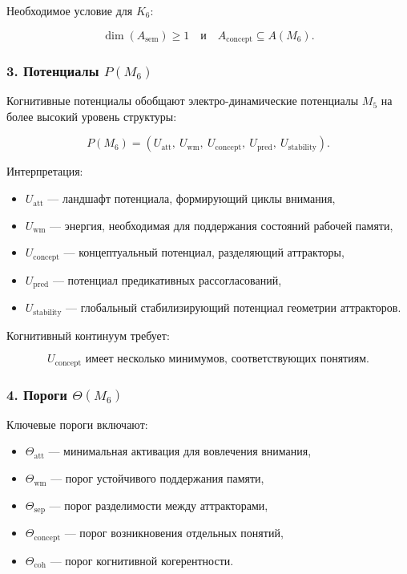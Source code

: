 Необходимое условие для $K_6$:

\[
\dim(A_{\mathrm{sem}}) \ge 1
\quad\text{и}\quad
A_{\mathrm{concept}} \subseteq A(M_6).
\]

\subsubsection*{3. Потенциалы \texorpdfstring{$P(M_6)$}{P(M_6)}}

Когнитивные потенциалы обобщают электро-динамические потенциалы $M_5$ на более высокий уровень структуры:

\[
P(M_6) =
(U_{\mathrm{att}},\
U_{\mathrm{wm}},\
U_{\mathrm{concept}},\
U_{\mathrm{pred}},\
U_{\mathrm{stability}}).
\]

Интерпретация:

\begin{itemize}
    \item $U_{\mathrm{att}}$ — ландшафт потенциала, формирующий циклы внимания,
    \item $U_{\mathrm{wm}}$ — энергия, необходимая для поддержания состояний рабочей памяти,
    \item $U_{\mathrm{concept}}$ — концептуальный потенциал, разделяющий аттракторы,
    \item $U_{\mathrm{pred}}$ — потенциал предикативных рассогласований,
    \item $U_{\mathrm{stability}}$ — глобальный стабилизирующий потенциал геометрии аттракторов.
\end{itemize}

Когнитивный континуум требует:

\[
U_{\mathrm{concept}} \text{ имеет несколько минимумов, соответствующих понятиям}.
\]

\subsubsection*{4. Пороги \texorpdfstring{$\Theta(M_6)$}{\Theta(M_6)}}

Ключевые пороги включают:

\begin{itemize}
    \item $\Theta_{\mathrm{att}}$ — минимальная активация для вовлечения внимания,
    \item $\Theta_{\mathrm{wm}}$ — порог устойчивого поддержания памяти,
    \item $\Theta_{\mathrm{sep}}$ — порог разделимости между аттракторами,
    \item $\Theta_{\mathrm{concept}}$ — порог возникновения отдельных понятий,
    \item $\Theta_{\mathrm{coh}}$ — порог когнитивной когерентности.
\end{itemize}

